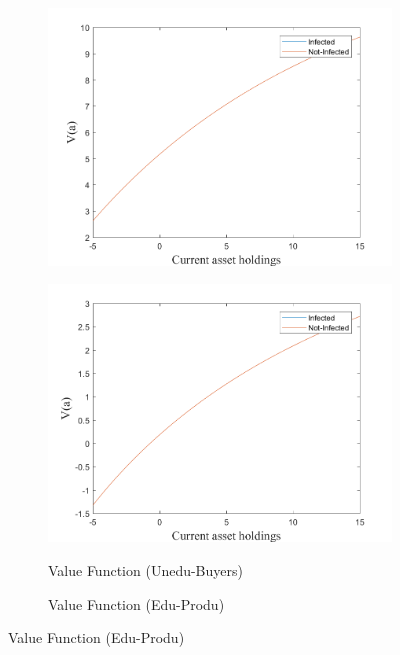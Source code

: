 \begin{figure}[H]
\begin{subfigure}{0.5\textwidth}
   \includegraphics[width=\linewidth,height = 0.22\textheight]{figures/mio/FIG13.png}
    \label{fig_dert}
\end{subfigure}
\hspace*{\fill}
\begin{subfigure}{0.5\textwidth}\caption{Value Function (Unedu-Buyers)}
   \includegraphics[width=\linewidth,height = 0.22\textheight]{figures/mio/FIG14.png}
    \label{fig:x_b}
\end{subfigure}
\bigskip
\begin{subfigure}{0.5\textwidth}\caption{Value Function (Edu-Produ)}

\end{subfigure}
\end{figure}
